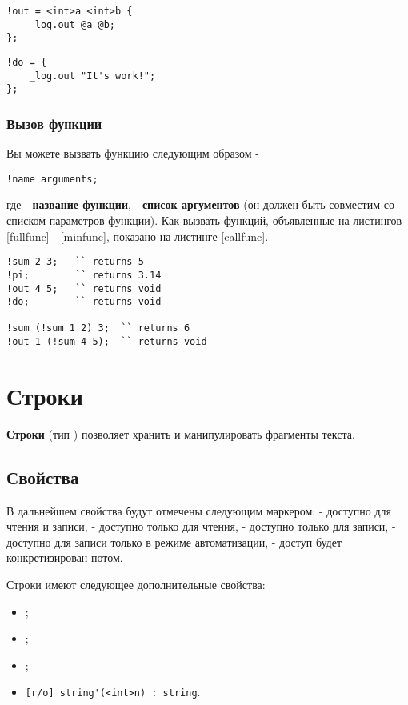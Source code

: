 \documentclass[a4paper, 14pt]{extarticle}
\newenvironment{icItems}
	{ \begin{itemize} [noitemsep,nolistsep] }
	{ \end{itemize} }
\begin{document}
\begin{lstlisting}[caption=Функция без типа возвращаемой значений, label=notypefunc]
!out = <int>a <int>b {
	_log.out @a @b;
};
\end{lstlisting}

\begin{lstlisting}[caption=Функция без аргументов и тип возвращаемой значений, label=minfunc]
!do = {
	_log.out "It's work!";
};
\end{lstlisting}

\subsubsection{Вызов функции}

Вы можете вызвать функцию следующим образом -
\begin{lstlisting}[numbers=none]
!name arguments;
\end{lstlisting}
где  - {\bf название функции},  - {\bf список аргументов} (он должен быть совместим со списком параметров функции). Как вызвать функций, объявленные на листингов \ref{fullfunc} - \ref{minfunc}, показано на листинге \ref{callfunc}.


\begin{lstlisting}[caption=Вызов функций, label=callfunc]
!sum 2 3; 	`` returns 5
!pi; 		`` returns 3.14
!out 4 5; 	`` returns void
!do; 		`` returns void

!sum (!sum 1 2) 3;	`` returns 6
!out 1 (!sum 4 5);	`` returns void
\end{lstlisting}

\section{Строки}

{\bf Строки} (тип \str{}) позволяет хранить и манипулировать фрагменты текста. 

\subsection{Свойства}

В дальнейшем свойства будут отмечены следующим маркером: \code{[r/w]} - доступно для чтения и записи, \code{[r/o]} - доступно только для чтения, \code{[w/o]} - доступно только для записи,  \code{[r/*]} - доступно для записи только в режиме автоматизации, \code{[*/*]} - доступ будет конкретизирован потом.

Строки имеют следующее дополнительные свойства:
\begin{icItems}
\item
	;
\item
	;
\item
	;
\item
	\lstinline|[r/o] string'(<int>n) : string|.
\end{icItems}
\end{document}
